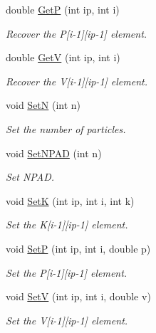 \begin{DoxyCompactItemize}
double \hyperlink{class_t_djangoh_a2bc14d05d493e604f9f7fef847c19c9b}{Get\+P} (int ip, int i)
\begin{DoxyCompactList}\small\item\em Recover the P\mbox{[}i-\/1\mbox{]}\mbox{[}ip-\/1\mbox{]} element. \end{DoxyCompactList}\item 
double \hyperlink{class_t_djangoh_a4993a87fef8917b9ed8a55811aa2daf6}{Get\+V} (int ip, int i)
\begin{DoxyCompactList}\small\item\em Recover the V\mbox{[}i-\/1\mbox{]}\mbox{[}ip-\/1\mbox{]} element. \end{DoxyCompactList}\item 
void \hyperlink{class_t_djangoh_ac15b9862e954349fd9f0911c71e0e664}{Set\+N} (int n)
\begin{DoxyCompactList}\small\item\em Set the number of particles. \end{DoxyCompactList}\item 
void \hyperlink{class_t_djangoh_a0ed7bb7e7433a6385b5838ce519168a2}{Set\+N\+P\+A\+D} (int n)
\begin{DoxyCompactList}\small\item\em Set N\+P\+A\+D. \end{DoxyCompactList}\item 
void \hyperlink{class_t_djangoh_a045a7fabe350589453e240bff98ca54b}{Set\+K} (int ip, int i, int k)
\begin{DoxyCompactList}\small\item\em Set the K\mbox{[}i-\/1\mbox{]}\mbox{[}ip-\/1\mbox{]} element. \end{DoxyCompactList}\item 
void \hyperlink{class_t_djangoh_aa9cfa62ac6bf01a7f5214cc62cdae34c}{Set\+P} (int ip, int i, double p)
\begin{DoxyCompactList}\small\item\em Set the P\mbox{[}i-\/1\mbox{]}\mbox{[}ip-\/1\mbox{]} element. \end{DoxyCompactList}\item 
void \hyperlink{class_t_djangoh_a472e228f316f1473c940dfa37c22637c}{Set\+V} (int ip, int i, double v)
\begin{DoxyCompactList}\small\item\em Set the V\mbox{[}i-\/1\mbox{]}\mbox{[}ip-\/1\mbox{]} element. \end{DoxyCompactList}\item 

\end{DoxyCompactItemize}
